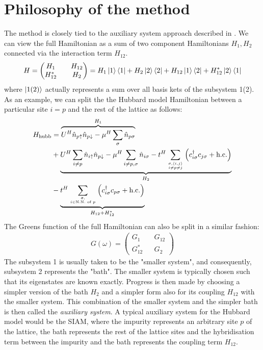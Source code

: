 \documentclass[12pt]{article}
\numberwithin{equation}{section}
\begin{document}
\section{Philosophy of the method}
The method is closely tied to the auxiliary system approach described in \cite{martin_2016}. We can view the full Hamiltonian as a sum of two component Hamiltonians \(H_1, H_2\) connected via the interaction term \(H_{12}\).
\begin{equation}\begin{aligned}
	H = \begin{pmatrix} H_1 && H_{12} \\ H_{12}^* && H_2 \end{pmatrix} = H_1 \ket{1}\bra{1} + H_2\ket{2}\bra{2} + H_{12}\ket{1}\bra{2} + H_{12}^*\ket{2}\bra{1}
\end{aligned}\end{equation}
where \(\ket{1(2)}\) actually represents a sum over all basis kets of the subsystem 1(2). As an example, we can split the the Hubbard model Hamiltonian between a particular site \(i = p\) and the rest of the lattice as follows:
\begin{equation}\begin{aligned}
	H_\text{hubb} &= \overbrace{U^H\hat n_{p \uparrow} \hat n_{p \downarrow} - \mu^H \sum_\sigma \hat n_{p \sigma}}^{H_1} \\
		      &+ \underbrace{U^H\sum_{i \neq p}\hat n_{i \uparrow} \hat n_{p \downarrow} - \mu^H \sum_{i \neq p, \sigma} \hat n_{i \sigma} -t^H\sum_{\sigma,\left<i,j \right>\atop{i \neq p \neq j}}\left(c^\dagger_{i\sigma} c_{j\sigma} + \text{h.c.}\right)}_{H_2}\\
		      & -\underbrace{t^H\sum_{\sigma,\atop{i \in \text{N.N. of }p}}\left(c^\dagger_{i\sigma} c_{p\sigma} + \text{h.c.}\right)}_{H_{12} + H_{12}^*}\\
\end{aligned}\end{equation}
The Greens function of the full Hamiltonian can also be split in a similar fashion:
\begin{equation}\begin{aligned}
	G(\omega) = \begin{pmatrix} G_1 && G_{12} \\ G_{12}^* && G_2 \end{pmatrix} 
\end{aligned}\end{equation}
The subsystem 1 is usually taken to be the "smaller system", and consequently, subsystem 2 represents the "bath". The smaller system is typically chosen such that its eigenstates are known exactly. Progress is then made by choosing a simpler version of the bath \(H_2\) and a simpler form also for its coupling \(H_{12}\) with the smaller system. This combination of the smaller system and the simpler bath is then called the \textit{auxiliary system}. A typical auxiliary system for the Hubbard model would be the SIAM, where the impurity represents an arbitrary site \(p\) of the lattice, the bath represents the rest of the lattice sites and the hybridisation term between the impurity and the bath represents the coupling term \(H_{12}\).
\end{document}
